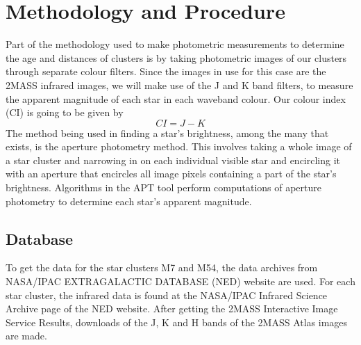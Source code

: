 \documentclass[12pt]{article}
\begin{document}
	
	\pagebreak
	\section{Methodology and Procedure}
	Part of the methodology used to make photometric measurements to determine the age and distances of clusters is by taking photometric images of our clusters through separate colour filters. Since the images in use for this case are the 2MASS infrared images, we will make use of the J and K band filters, to measure the apparent magnitude of each star in each waveband colour. Our colour index (CI) is going to be given by\[CI = J - K\]
	The method being used in finding a star's brightness, among the many that exists, is the  aperture photometry method. This involves taking a whole image of a star cluster and narrowing in on each individual visible star and encircling it with an aperture that encircles all image pixels containing a part of the star's brightness. Algorithms in the APT tool perform computations of aperture photometry to determine each star's apparent magnitude.
		\subsection{Database}
		To get the data for the star clusters M7 and M54, the data archives from NASA/IPAC EXTRAGALACTIC DATABASE (NED) website are used. For each star cluster, the infrared data is found at the NASA/IPAC Infrared Science Archive page of the NED website. After getting the 2MASS Interactive Image Service Results, downloads of the J, K and H bands of the 2MASS Atlas images are made.
\end{document}
